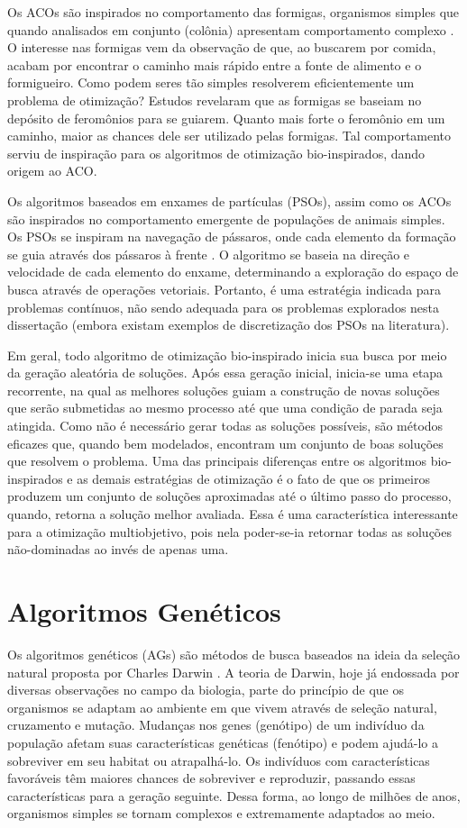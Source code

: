 Os ACOs são inspirados no comportamento das formigas, organismos simples que quando analisados em conjunto (colônia) apresentam comportamento complexo \cite{Dorigo1996}. O interesse nas formigas vem da observação de que, ao buscarem por comida, acabam por encontrar o caminho mais rápido entre a fonte de alimento e o formigueiro. Como podem seres tão simples resolverem eficientemente um problema de otimização? Estudos revelaram que as formigas se baseiam no depósito de feromônios para se guiarem. Quanto mais forte o feromônio em um caminho, maior as chances dele ser utilizado pelas formigas. Tal comportamento serviu de inspiração para os algoritmos de otimização bio-inspirados, dando origem ao \ac{ACO}.

Os algoritmos baseados em enxames de partículas (PSOs), assim como os ACOs são inspirados no comportamento emergente de populações de animais simples. Os PSOs se inspiram na navegação de pássaros, onde cada elemento da formação se guia através dos pássaros à frente \cite{PSO}. O algoritmo se baseia na direção e velocidade de cada elemento do enxame, determinando a exploração do espaço de busca através de operações vetoriais. Portanto, é uma estratégia indicada para problemas contínuos, não sendo adequada para os problemas explorados nesta dissertação (embora existam exemplos de discretização dos PSOs na literatura).

Em geral, todo algoritmo de otimização bio-inspirado inicia sua busca por meio da geração aleatória de soluções. Após essa geração inicial, inicia-se uma etapa recorrente, na qual as melhores soluções guiam a construção de novas soluções que serão submetidas ao mesmo processo até que uma condição de parada seja atingida. Como não é necessário gerar todas as soluções possíveis, são métodos eficazes que, quando bem modelados, encontram um conjunto de boas soluções que resolvem o problema. Uma das principais diferenças entre os algoritmos bio-inspirados e as demais estratégias de otimização é o fato de que os primeiros produzem um conjunto de soluções aproximadas até o último passo do processo, quando, retorna a solução melhor avaliada. Essa é uma característica interessante para a otimização multiobjetivo, pois nela poder-se-ia retornar todas as soluções não-dominadas ao invés de apenas uma.

\section{Algoritmos Genéticos}
\label{section_ag}
Os algoritmos genéticos (AGs) são métodos de busca baseados na ideia da seleção natural proposta por Charles Darwin \cite{Darwin1859}. A teoria de Darwin, hoje já endossada por diversas observações no campo da biologia, parte do princípio de que os organismos se adaptam ao ambiente em que vivem através de seleção natural, cruzamento e mutação. Mudanças nos genes (genótipo) de um indivíduo da população afetam suas características genéticas (fenótipo) e podem ajudá-lo a sobreviver em seu habitat ou atrapalhá-lo. Os indivíduos com características favoráveis têm maiores chances de sobreviver e reproduzir, passando essas características para a geração seguinte. Dessa forma, ao longo de milhões de anos, organismos simples se tornam complexos e extremamente adaptados ao meio.

